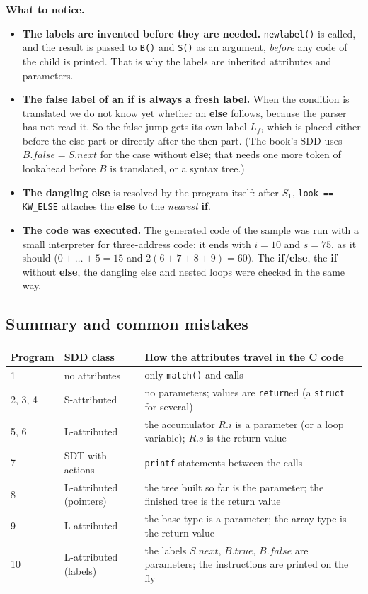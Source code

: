\documentclass[11pt,a4paper]{article}
\begin{document}
\textbf{What to notice.}
\begin{itemize}[nosep]
\item \textbf{The labels are invented before they are needed.} \texttt{newlabel()} is called, and the result is passed to \texttt{B()} and \texttt{S()} as an argument, \emph{before} any code of the child is printed. That is why the labels are inherited attributes and parameters.
\item \textbf{The false label of an \textbf{if} is always a fresh label.} When the condition is translated we do not know yet whether an \textbf{else} follows, because the parser has not read it. So the false jump gets its own label $L_f$, which is placed either before the else part or directly after the then part. (The book's SDD uses $B.false=S.next$ for the case without \textbf{else}; that needs one more token of lookahead before $B$ is translated, or a syntax tree.)
\item \textbf{The dangling else} is resolved by the program itself: after $S_1$, \texttt{look == KW\_ELSE} attaches the \textbf{else} to the \emph{nearest} \textbf{if}.
\item \textbf{The code was executed.} The generated code of the sample was run with a small interpreter for three-address code: it ends with $i=10$ and $s=75$, as it should ($0+\dots+5=15$ and $2(6+7+8+9)=60$). The \textbf{if}/\textbf{else}, the \textbf{if} without \textbf{else}, the dangling else and nested loops were checked in the same way.
\end{itemize}

\subsection{Summary and common mistakes}
\label{sec:rdsummary}

\begin{center}
\small
\begin{tabular}{@{}l p{4.0cm} p{6.4cm}@{}}
\toprule
\textbf{Program} & \textbf{SDD class} & \textbf{How the attributes travel in the C code} \\ \midrule
1 & no attributes & only \texttt{match()} and calls \\
2, 3, 4 & S-attributed & no parameters; values are \texttt{return}ed (a \texttt{struct} for several) \\
5, 6 & L-attributed & the accumulator $R.i$ is a parameter (or a loop variable); $R.s$ is the return value \\
7 & SDT with actions & \texttt{printf} statements between the calls \\
8 & L-attributed (pointers) & the tree built so far is the parameter; the finished tree is the return value \\
9 & L-attributed & the base type is a parameter; the array type is the return value \\
10 & L-attributed (labels) & the labels $S.next$, $B.true$, $B.false$ are parameters; the instructions are printed on the fly \\ \bottomrule
\end{tabular}
\end{center}
\end{document}
